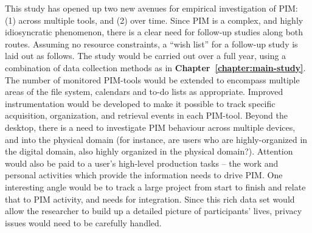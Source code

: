 This study has opened up two new avenues for empirical investigation of PIM: (1) across multiple tools, and (2) over time. 
Since PIM is a complex, and highly idiosyncratic phenomenon, there is a clear need for follow-up studies along both routes.
Assuming no resource constraints, a ``wish list'' for a follow-up study is laid out as follows.  The study would be carried out over a full year, using a combination of data collection methods as in \textbf{Chapter~\ref{chapter:main-study}}.  
The number of monitored PIM-tools would be extended to encompass multiple areas of the file system, calendars and to-do lists as appropriate.  Improved instrumentation would be developed to make it possible to track specific acquisition, organization, and retrieval events in each PIM-tool.  Beyond the desktop, there is a need to investigate PIM behaviour across multiple devices, and into the physical domain (for instance, are users who are highly-organized in the digital domain, also highly organized in the physical domain?).  Attention would also be paid to a user's high-level production tasks -- the work and personal activities which provide the information needs to drive PIM.  One interesting angle would be to track a large project from start to finish and relate that to PIM activity, and needs for integration.  Since this 
rich data set would allow the researcher to build up a detailed picture of participants' lives, privacy issues would need to be carefully handled.


